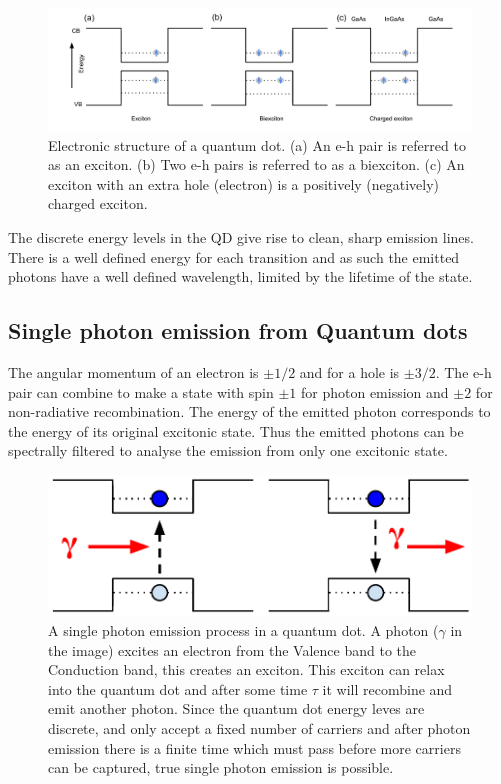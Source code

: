 \begin{figure}[h!] \begin{center}
\includegraphics[width=1\textwidth]{images/estructure.pdf} \end{center}
\caption{
Electronic structure of a quantum dot. (a) An e-h pair is referred to as an
exciton. (b) Two e-h pairs is referred to as a biexciton. (c) An exciton with an
extra hole (electron) is a positively (negatively) charged exciton.
} \label{fig:estructure} \end{figure}

The discrete energy levels in the QD give rise to clean, sharp emission lines.
There is a well defined energy for each transition and as such the emitted
photons have a well defined wavelength, limited by the lifetime of the state.

\subsection{Single photon emission from Quantum dots }

The angular momentum of an electron is $\pm 1/2$ and for a hole is $\pm 3/2$.
The e-h pair can combine to make a state with spin $\pm 1$ for photon emission
and $\pm 2$ for non-radiative recombination. The energy of the emitted photon
corresponds to the energy of its original excitonic state. Thus the emitted
photons can be spectrally filtered to analyse the emission from only one
excitonic state.

\begin{figure}[h!] \begin{center}
\includegraphics[width=1\textwidth]{images/qd_photon.pdf} \end{center}
\caption{ A single photon emission process in a quantum dot. A photon ($\gamma$ in the
image) excites an electron from the Valence band to the Conduction band, this
creates an exciton. This exciton can relax into the quantum dot and after some
time $\tau$ it will recombine and emit another photon. Since the quantum dot
energy leves are discrete, and only accept a fixed number of carriers and after
photon emission there is a finite time which must pass before more carriers can
be captured, true single photon emission is possible.
} \label{fig:qd_photon}
\end{figure}

